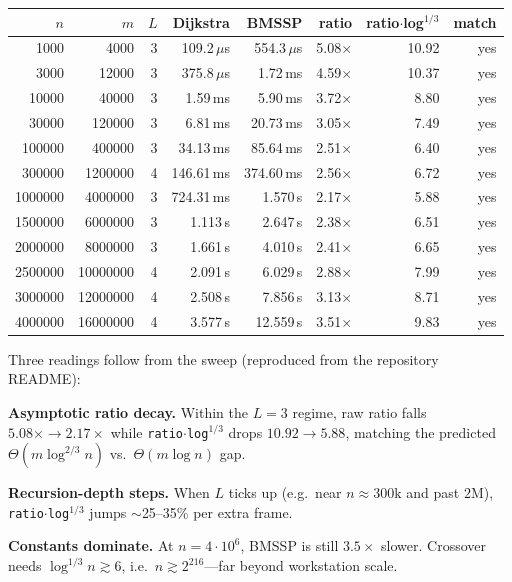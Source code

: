 \documentclass[11pt,a4paper]{article}
\makeatletter
\let\enitfb@enumerate\enumerate
\let\enitfb@endenumerate\endenumerate
\renewenvironment{enumerate}[1][]{\enitfb@enumerate}{\enitfb@endenumerate}%
\newcommand{\BMSSP}{\textsc{BMSSP}\xspace}
\newcommand{\code}[1]{\texttt{#1}}
\theoremstyle{plain}
\theoremstyle{definition}
\makeatother
\begin{document}
\begin{center}
\small
\begin{tabular}{@{}rrrrrrrr@{}}
\hline
$n$ & $m$ & $L$ & Dijkstra & \BMSSP & ratio & ratio$\cdot$log$^{1/3}$ & match \\
\hline
1000 & 4000 & 3 & 109.2\,$\mu$s & 554.3\,$\mu$s & 5.08$\times$ & 10.92 & yes \\
3000 & 12000 & 3 & 375.8\,$\mu$s & 1.72\,ms & 4.59$\times$ & 10.37 & yes \\
10000 & 40000 & 3 & 1.59\,ms & 5.90\,ms & 3.72$\times$ & 8.80 & yes \\
30000 & 120000 & 3 & 6.81\,ms & 20.73\,ms & 3.05$\times$ & 7.49 & yes \\
100000 & 400000 & 3 & 34.13\,ms & 85.64\,ms & 2.51$\times$ & 6.40 & yes \\
300000 & 1200000 & 4 & 146.61\,ms & 374.60\,ms & 2.56$\times$ & 6.72 & yes \\
1000000 & 4000000 & 3 & 724.31\,ms & 1.570\,s & 2.17$\times$ & 5.88 & yes \\
1500000 & 6000000 & 3 & 1.113\,s & 2.647\,s & 2.38$\times$ & 6.51 & yes \\
2000000 & 8000000 & 3 & 1.661\,s & 4.010\,s & 2.41$\times$ & 6.65 & yes \\
2500000 & 10000000 & 4 & 2.091\,s & 6.029\,s & 2.88$\times$ & 7.99 & yes \\
3000000 & 12000000 & 4 & 2.508\,s & 7.856\,s & 3.13$\times$ & 8.71 & yes \\
4000000 & 16000000 & 4 & 3.577\,s & 12.559\,s & 3.51$\times$ & 9.83 & yes \\
\hline
\end{tabular}
\end{center}

Three readings follow from the sweep (reproduced from the repository README):
\begin{enumerate}[leftmargin=1.6em,itemsep=0.25em]
\item \textbf{Asymptotic ratio decay.} Within the $L=3$ regime, raw ratio falls
      $5.08\times \to 2.17\times$ while \code{ratio$\cdot$log$^{1/3}$} drops
      $10.92 \to 5.88$, matching the predicted
      $\Theta(m\log^{2/3} n)$ vs.\ $\Theta(m\log n)$ gap.
\item \textbf{Recursion-depth steps.} When $L$ ticks up (e.g.\ near
      $n\approx 300\mathrm{k}$ and past $2\mathrm{M}$),
      \code{ratio$\cdot$log$^{1/3}$} jumps $\sim$25--35\% per extra frame.
\item \textbf{Constants dominate.} At $n=4\cdot 10^6$, \BMSSP{} is still
      $3.5\times$ slower. Crossover needs $\log^{1/3} n \gtrsim 6$, i.e.\
      $n \gtrsim 2^{216}$---far beyond workstation scale.
\end{enumerate}
\end{document}
